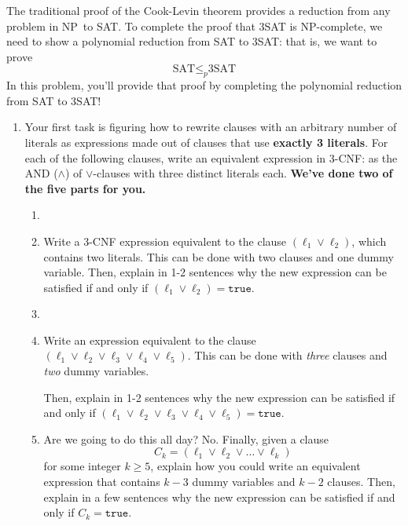 \documentclass[12 pt, letterpaper]{hmcpset}
\newcommand{\NP}{\textsf{NP}}
\begin{document}
\begin{problem}
The traditional proof of the Cook-Levin theorem provides a reduction from any problem in \NP\, to SAT. To complete the proof that 3SAT is \NP-complete, we need to show a polynomial reduction from SAT to 3SAT: that is, we want to prove
\[
    \text{SAT} \leq_p \text{3SAT}
\]
In this problem, you'll provide that proof by completing the polynomial reduction from SAT to 3SAT! 

\begin{enumerate}[label = (\arabic*)]
\item Your first task is figuring how to rewrite clauses with an arbitrary number of literals as expressions made out of clauses that use \textbf{exactly 3 literals}. For each of the following clauses, write an equivalent expression in 3-CNF: as the AND ($\wedge$) of $\vee$-clauses with three distinct literals each. \textbf{We've done two of the five parts for you.}

\begin{enumerate}[label = (\roman*)]
	\item  

    \item Write a 3-CNF expression equivalent to the clause $(\ell_1 \vee \ell_2)$, which contains two literals. This can be done with two clauses and one dummy variable. Then, explain in 1-2 sentences why the new expression can be satisfied if and only if $(\ell_1 \vee \ell_2) = \mathtt{true}$.

    \item
    \item Write an expression equivalent to the clause $(\ell_1 \vee \ell_2 \vee \ell_3 \vee \ell_4 \vee \ell_5)$.  This can be done with \emph{three} clauses and \emph{two} dummy variables.
    
    Then, explain in 1-2 sentences why the new expression can be satisfied if and only if $(\ell_1 \vee \ell_2 \vee \ell_3 \vee \ell_4 \vee \ell_5) = \mathtt{true}$.

    \item Are we going to do this all day? No. Finally, given a clause
    \[
        C_k = (\ell_1 \vee \ell_2 \vee \dots \vee \ell_k)
    \]
    for some integer $k \geq 5$, explain how you could write an equivalent expression that contains $k-3$ dummy variables and $k-2$ clauses. Then, explain in a few sentences why the new expression can be satisfied if and only if $C_k = \mathtt{true}$. 
    

\end{enumerate}
\end{enumerate}
\end{problem}
\end{document}
